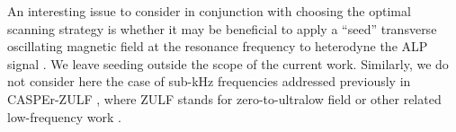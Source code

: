 An interesting issue to consider in conjunction with choosing the optimal scanning strategy is whether it may be beneficial to apply a ``seed'' transverse oscillating magnetic field at the resonance frequency to heterodyne the ALP signal \cite{Aybas_2021_Quantum_sensitivity, Omarov_2022_Speedingaxionhaloscope}. We leave seeding outside the scope of the current work. Similarly, we do not consider here the case of sub-kHz frequencies addressed previously in CASPEr-ZULF \cite{Garcon_2019_Constraints, Wu_2019_Comagnetometer}, where ZULF stands for zero-to-ultralow field or other related low-frequency work \cite{Abel2017Electric_PRX, Terrano2019Axionlike23_PhysRevLett, Roussy2021AxionlikeSeven_PhysRevLett, BlochItay2022Floquet_sciadv}. 


